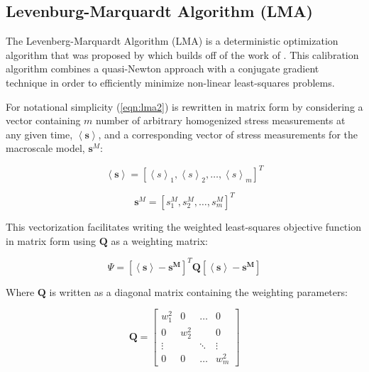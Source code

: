\subsection{Levenburg-Marquardt Algorithm (LMA)}

The Levenberg-Marquardt Algorithm (LMA) is a deterministic optimization algorithm that was proposed by \citet{marquardt_algorithm_1963} which builds off of the work of \citet{levenberg_method_1944}. This calibration algorithm combines a quasi-Newton approach with a conjugate gradient technique in order to efficiently minimize non-linear least-squares problems. 

For notational simplicity (\ref{eqn:lma2}) is rewritten in matrix form by considering a vector containing $m$ number of arbitrary homogenized stress measurements at any given time, $\left< \mathbf{s} \right>$, and a corresponding vector of stress measurements for the macroscale model, $\mathbf{s}^M$:

\begin{equation}
\left< \mathbf{s} \right>=\left[\left< s \right>_1, \left< s \right>_2, \dots, \left< s \right>_m \right]^T
\label{eqn:lma3}
\end{equation}

\begin{equation}
\mathbf{s}^M=\left[s^M_1, s^M_2, \dots, s^M_m \right]^T
\label{eqn:lma4}
\end{equation}

This vectorization facilitates writing the weighted least-squares objective function in matrix form using $\mathbf{Q}$ as a weighting matrix:

\begin{equation}
\Psi=\left[\left<\mathbf{s}\right>-\mathbf{s^M}\right]^T \mathbf{Q} \left[\left<\mathbf{s}\right>-\mathbf{s^M}\right]
\label{eqn:lma5}
\end{equation}

Where $\mathbf{Q}$ is written as a diagonal matrix containing the weighting parameters:

\begin{equation}
\mathbf{Q}=\begin{bmatrix}
w_1^2 & 0     & \dots  & 0\\ 
0     & w_2^2 &        & 0\\ 
\vdots&       & \ddots & \vdots \\ 
0     & 0     & \dots  & w_m^2
\end{bmatrix}
\label{eqn:lma6}
\end{equation}


